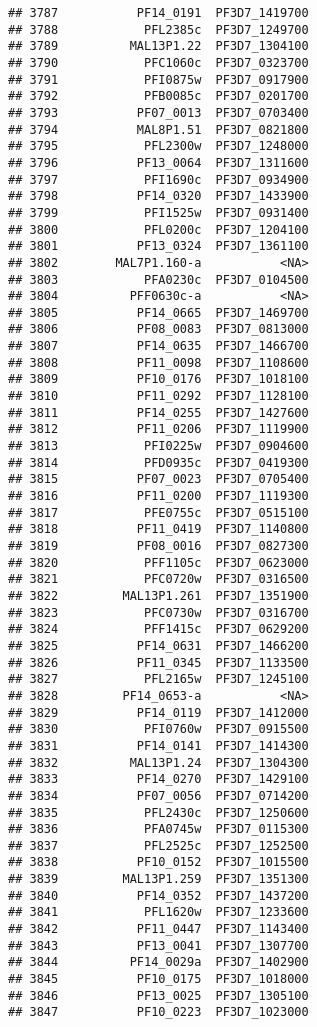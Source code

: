 \documentclass{article}\usepackage[]{graphicx}\usepackage[]{color}
\makeatletter
\newenvironment{kframe}{%
 \def\at@end@of@kframe{}%
 \ifinner\ifhmode%
  \def\at@end@of@kframe{\end{minipage}}%
  \begin{minipage}{\columnwidth}%
 \fi\fi%
 \def\FrameCommand##1{\hskip\@totalleftmargin \hskip-\fboxsep
 \colorbox{shadecolor}{##1}\hskip-\fboxsep
     \hskip-\linewidth \hskip-\@totalleftmargin \hskip\columnwidth}%
 \MakeFramed {\advance\hsize-\width
   \@totalleftmargin\z@ \linewidth\hsize
   \@setminipage}}%
 {\par\unskip\endMakeFramed%
 \at@end@of@kframe}
\newenvironment{knitrout}{}{} %
\makeatother
\begin{document}
\begin{knitrout}
\begin{kframe}
\begin{verbatim}
## 3787           PF14_0191  PF3D7_1419700
## 3788            PFL2385c  PF3D7_1249700
## 3789          MAL13P1.22  PF3D7_1304100
## 3790            PFC1060c  PF3D7_0323700
## 3791            PFI0875w  PF3D7_0917900
## 3792            PFB0085c  PF3D7_0201700
## 3793           PF07_0013  PF3D7_0703400
## 3794           MAL8P1.51  PF3D7_0821800
## 3795            PFL2300w  PF3D7_1248000
## 3796           PF13_0064  PF3D7_1311600
## 3797            PFI1690c  PF3D7_0934900
## 3798           PF14_0320  PF3D7_1433900
## 3799            PFI1525w  PF3D7_0931400
## 3800            PFL0200c  PF3D7_1204100
## 3801           PF13_0324  PF3D7_1361100
## 3802        MAL7P1.160-a           <NA>
## 3803            PFA0230c  PF3D7_0104500
## 3804          PFF0630c-a           <NA>
## 3805           PF14_0665  PF3D7_1469700
## 3806           PF08_0083  PF3D7_0813000
## 3807           PF14_0635  PF3D7_1466700
## 3808           PF11_0098  PF3D7_1108600
## 3809           PF10_0176  PF3D7_1018100
## 3810           PF11_0292  PF3D7_1128100
## 3811           PF14_0255  PF3D7_1427600
## 3812           PF11_0206  PF3D7_1119900
## 3813            PFI0225w  PF3D7_0904600
## 3814            PFD0935c  PF3D7_0419300
## 3815           PF07_0023  PF3D7_0705400
## 3816           PF11_0200  PF3D7_1119300
## 3817            PFE0755c  PF3D7_0515100
## 3818           PF11_0419  PF3D7_1140800
## 3819           PF08_0016  PF3D7_0827300
## 3820            PFF1105c  PF3D7_0623000
## 3821            PFC0720w  PF3D7_0316500
## 3822         MAL13P1.261  PF3D7_1351900
## 3823            PFC0730w  PF3D7_0316700
## 3824            PFF1415c  PF3D7_0629200
## 3825           PF14_0631  PF3D7_1466200
## 3826           PF11_0345  PF3D7_1133500
## 3827            PFL2165w  PF3D7_1245100
## 3828         PF14_0653-a           <NA>
## 3829           PF14_0119  PF3D7_1412000
## 3830            PFI0760w  PF3D7_0915500
## 3831           PF14_0141  PF3D7_1414300
## 3832          MAL13P1.24  PF3D7_1304300
## 3833           PF14_0270  PF3D7_1429100
## 3834           PF07_0056  PF3D7_0714200
## 3835            PFL2430c  PF3D7_1250600
## 3836            PFA0745w  PF3D7_0115300
## 3837            PFL2525c  PF3D7_1252500
## 3838           PF10_0152  PF3D7_1015500
## 3839         MAL13P1.259  PF3D7_1351300
## 3840           PF14_0352  PF3D7_1437200
## 3841            PFL1620w  PF3D7_1233600
## 3842           PF11_0447  PF3D7_1143400
## 3843           PF13_0041  PF3D7_1307700
## 3844          PF14_0029a  PF3D7_1402900
## 3845           PF10_0175  PF3D7_1018000
## 3846           PF13_0025  PF3D7_1305100
## 3847           PF10_0223  PF3D7_1023000

\end{verbatim}
\end{kframe}
\end{knitrout}
\end{document}
